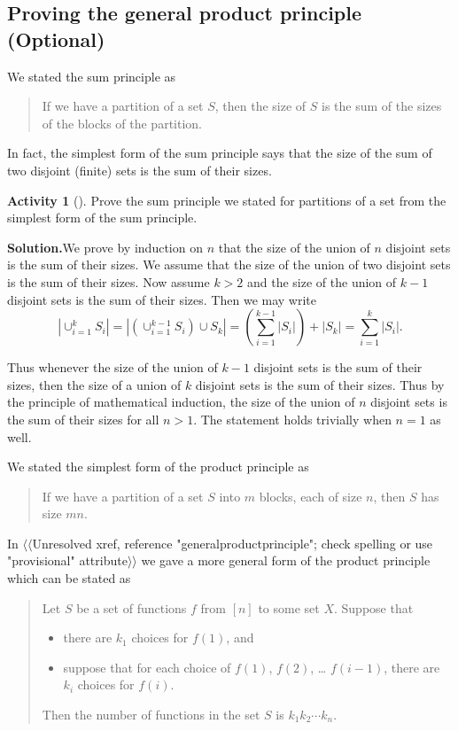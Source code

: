 \documentclass[10pt,]{book}
\theoremstyle{plain}
\theoremstyle{definition}
\newtheorem{activity}[project]{Activity}
\numberwithin{equation}{chapter}
\begin{document}
\subsection[{Proving the general product principle (Optional)}]{Proving the general product principle (Optional)}\label{subsection-8}
We stated the sum principle as%
\begin{quote}If we have a partition of a set \(S\), then the size of \(S\) is the sum of the sizes of the blocks of the partition.\end{quote}
In fact, the simplest form of the sum principle says that the size of the sum of two disjoint (finite) sets is the sum of their sizes.%
\begin{activity}[]\label{activity-30}
Prove the sum principle we stated for partitions of a set from the simplest form of the sum principle.%
\par\medskip\noindent%
\textbf{Solution.}\quad We prove by induction on \(n\) that the size of the union of \(n\) disjoint sets is the sum of their sizes. We assume that the size of the union of two disjoint sets is the sum of their sizes. Now assume \(k>2\) and the size of the union of \(k-1\) disjoint sets is the sum of their sizes. Then we may write%
\begin{equation*}
|\cup_{i=1}^k S_i|=|\left(\cup_{i=1}^{k-1}S_i\right)\cup
S_k|=\left(\sum_{i=1}^{k-1}|S_i|\right) +|S_k|=\sum_{i=1}^k|S_i|.
\end{equation*}
%
\par
Thus whenever the size of the union of \(k-1\) disjoint sets is the sum of their sizes, then the size of a union of \(k\) disjoint sets is the sum of their sizes. Thus by the principle of mathematical induction, the size of the union of \(n\) disjoint sets is the sum of their sizes for all \(n>1\). The statement holds trivially when \(n=1\) as well.%
\end{activity}
We stated the simplest form of the product principle as%
\begin{quote}If we have a partition of a set \(S\) into \(m\) blocks, each of size \(n\), then \(S\) has size \(mn\).\end{quote}
In {$\langle\langle$Unresolved xref, reference "generalproductprinciple"; check spelling or use "provisional" attribute$\rangle\rangle$} we gave a more general form of the product principle which can be stated as %
\begin{quote}Let \(S\) be a set of functions \(f\) from \([n]\) to some set \(X\).  Suppose that \leavevmode%
\begin{itemize}[label=\textbullet]
\item{}there are \(k_1\) choices for \(f(1)\), and%
\item{}suppose that for each choice of \(f(1)\), \(f(2)\), \dots{} \(f(i-1)\), there are \(k_i\) choices for \(f(i)\).%
\end{itemize}
 Then the number of functions in the set \(S\) is \(k_1k_2\cdots k_n\).\end{quote}
\end{document}
